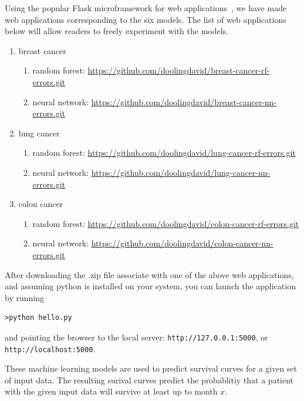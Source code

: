 \documentclass[10pt,letterpaper]{article}
\newcommand{\codewhite}[1]{\colorbox{white}{\texttt{#1}}}
\begin{document}
Using the popular Flask microframework for web applications~\cite{flask}, we have made web applications corresponding to the six models. The list of web applications below will allow readers to freely experiment with the models.

\begin{enumerate}[noitemsep]
\item breast cancer 
    \begin{enumerate}[noitemsep]
    \item random forest: \url{https://github.com/doolingdavid/breast-cancer-rf-errors.git}
    \item neural network: \url{https://github.com/doolingdavid/breast-cancer-nn-errors.git}
    \end{enumerate}
\item lung cancer
   \begin{enumerate}[noitemsep]
   \item random forest: \url{https://github.com/doolingdavid/lung-cancer-rf-errors.git}
   \item neural network: \url{https://github.com/doolingdavid/lung-cancer-nn-errors.git}
    \end{enumerate}
\item colon cancer
  \begin{enumerate}[noitemsep]
   \item random forest: \url{https://github.com/doolingdavid/colon-cancer-rf-errors.git}
   \item neural network: \url{https://github.com/doolingdavid/colon-cancer-nn-errors.git}
   \end{enumerate}
\end{enumerate}

After downloading the .zip file associate with one of the above web applications, and assuming 
python is installed on your system, you can launch the application by running
\begin{verbatim}
>python hello.py
\end{verbatim}
and pointing the browser to the local server: \codewhite{http://127.0.0.1:5000}, or 
\codewhite{http://localhost:5000}.


These machine learning models are used to predict survival curves for a given set of input data. 
The resulting surival curves predict the probablitiy that a patient with the given input data will survive at least up to month $x$.
\end{document}
